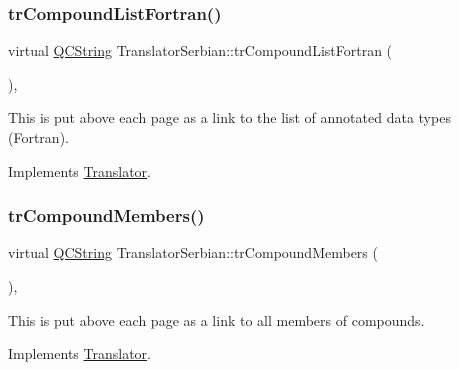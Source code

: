 \mbox{\label{class_translator_serbian_a1bbde1303f54fb3e008fd527d2880bc1}} 
\subsubsection{\texorpdfstring{trCompoundListFortran()}{trCompoundListFortran()}}
{\footnotesize\ttfamily virtual \mbox{\hyperlink{class_q_c_string}{Q\+C\+String}} Translator\+Serbian\+::tr\+Compound\+List\+Fortran (\begin{DoxyParamCaption}{ }\end{DoxyParamCaption})\hspace{0.3cm}{\ttfamily [inline]}, {\ttfamily [virtual]}}

This is put above each page as a link to the list of annotated data types (Fortran). 

Implements \mbox{\hyperlink{class_translator}{Translator}}.

\mbox{\label{class_translator_serbian_a3dc419e50f2a93e18445d59bf408f5c7}} 
\subsubsection{\texorpdfstring{trCompoundMembers()}{trCompoundMembers()}}
{\footnotesize\ttfamily virtual \mbox{\hyperlink{class_q_c_string}{Q\+C\+String}} Translator\+Serbian\+::tr\+Compound\+Members (\begin{DoxyParamCaption}{ }\end{DoxyParamCaption})\hspace{0.3cm}{\ttfamily [inline]}, {\ttfamily [virtual]}}

This is put above each page as a link to all members of compounds. 

Implements \mbox{\hyperlink{class_translator}{Translator}}.

\mbox{\label{class_translator_serbian_a7f1d04630e70495a567297582eb318ec}} 
